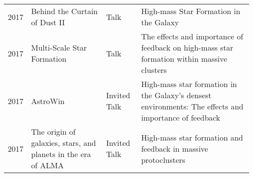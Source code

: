 \begin{tabular}{cp{1.8in}p{1.5cm}p{3.0in}}
    2017 &      Behind the Curtain of Dust II & Talk & High-mass Star Formation in the Galaxy \\
    2017 &      Multi-Scale Star Formation & Talk & The effects and importance of feedback on high-mass star formation within massive clusters \\
    2017 &      AstroWin & Invited Talk & High-mass star formation in the Galaxy's densest environments: The effects and importance of feedback\\
    2017 &      The origin of galaxies, stars, and planets in the era of ALMA & Invited Talk & High-mass star formation and feedback in massive protoclusters \\

\end{tabular}
